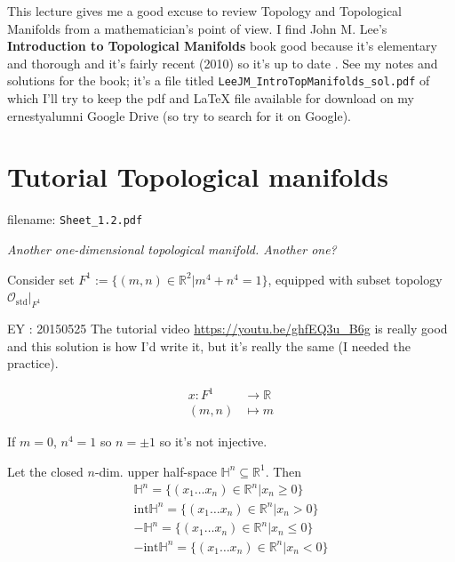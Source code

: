 This lecture gives me a good excuse to review Topology and Topological Manifolds from a mathematician's point of view.  I find John M. Lee's \textbf{Introduction to Topological Manifolds} book good because it's elementary and thorough and it's fairly recent (2010) so it's up to date \cite{dgdt:JMLee2010}.  See my notes and solutions for the book; it's a file titled \verb|LeeJM_IntroTopManifolds_sol.pdf| of which I'll try to keep the pdf and LaTeX file available for download on my ernestyalumni Google Drive (so try to search for it on Google).  







\section*{Tutorial Topological manifolds}

filename: \verb|Sheet_1.2.pdf|




\emph{Another one-dimensional topological manifold. Another one?}

Consider set $F^1:= \lbrace (m,n)\in \mathbb{R}^2 | m^4 + n^4=1 \rbrace$, equipped with subset topology $\left. \mathcal{O}_{\text{std}} \right|_{F^1}$


\solutionhead{} EY : 20150525 The tutorial video \url{https://youtu.be/ghfEQ3u_B6g} is really good and this solution is how I'd write it, but it's really the same (I needed the practice).

\[
\boxed{ \begin{aligned}
	x : F^1 & \to \mathbb{R} \\ 
	(m,n) & \mapsto m
	\end{aligned} }
\]

If $m=0$, $n^4=1$ so $n=\pm 1$ so it's not injective.  

Let the closed $n$-dim. upper half-space $\mathbb{H}^n \subseteq \mathbb{R}^1$.  Then
\[
\begin{aligned}
\mathbb{H}^n = \lbrace (x_1 \dots x_n) \in \mathbb{R}^n | x_n \geq 0 \rbrace \\ 
\text{int}\mathbb{H}^n = \lbrace (x_1 \dots x_n) \in \mathbb{R}^n | x_n > 0 \rbrace \\
- \mathbb{H}^n = \lbrace (x_1 \dots x_n) \in \mathbb{R}^n | x_n \leq 0 \rbrace \\ 
-\text{int}\mathbb{H}^n = \lbrace (x_1 \dots x_n) \in \mathbb{R}^n | x_n <0 \rbrace
\end{aligned}
\]

